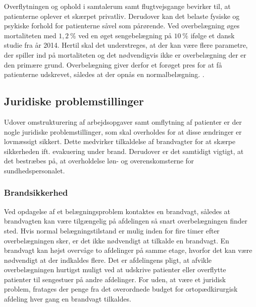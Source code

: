 \noindet
Overflytningen og ophold i samtalerum samt flugtvejsgange bevirker til, at patienterne oplever et skærpet privatliv. \cite{Madsen2014} Derudover kan det belaste fysiske og psykiske forhold for patienterne såvel som pårørende. \cite{Heidmann2014} Ved overbelægning øges mortaliteten med $1,2~\%$ ved en øget sengebelægning på $10~\%$ ifølge et dansk studie fra år 2014. \cite{Madsen2014} Hertil skal det understreges, at der kan være flere parametre, der spiller ind på mortaliteten og det nødvendigvis ikke er overbelægning der er den primære grund. Overbelægning giver derfor et forøget pres for at få patienterne udskrevet, således at der opnås en normalbelægning. .


\subsection{Juridiske problemstillinger}
Udover omstrukturering af arbejdsopgaver samt omflytning af patienter er der nogle juridiske problemstillinger, som skal overholdes for at disse ændringer er lovmæssigt sikkert. Dette medvirker tilkaldelse af brandvagter for at skærpe sikkerheden ift. evakuering under brand. Derudover er det samtidigt vigtigt, at det bestræbes på, at overholdelse løn- og overenskomsterne for sundhedspersonalet.

\subsubsection{Brandsikkerhed}
Ved opdagelse af et belægningsproblem kontaktes en brandvagt, således at brandvagten kan være tilgængelig på afdelingen så snart overbelægningen finder sted. Hvis normal belægningstilstand er mulig inden for fire timer efter overbelægningen sker, er det ikke nødvendigt at tilkalde en brandvagt. En brandvagt kan højst overvåge to afdelinger på samme etage, hvorfor det kan være nødvendigt at der indkaldes flere. Det er afdelingens pligt, at  afvikle overbelægningen hurtigst muligt ved at udskrive patienter eller overflytte patienter til sengestuer på andre afdelinger. \cite{Beredskab2016} For uden, at være et juridisk problem, fratages der penge fra det overordnede budget for ortopædkirurgisk afdeling hver gang en brandvagt tilkaldes.  

